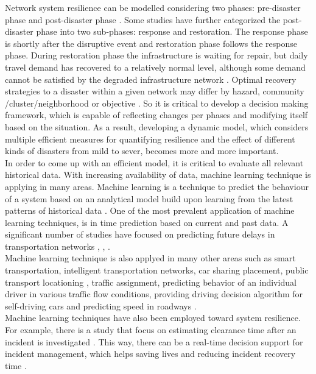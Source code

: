 \documentclass[11pt,twoside]{article}
\numberwithin{equation}{section}
\newcommand{\?}{\stackrel{?}{=}}
\begin{document}
Network system resilience can be modelled considering two phases: pre-disaster phase and post-disaster phase \citep{ahmed2020resilience}. Some studies have further categorized the post-disaster phase into two
  sub-phases: response and restoration. The response phase is shortly after the disruptive event and restoration phase follows the response phase. During restoration phase the infrastructure is waiting for repair, but daily travel demand has recovered to a relatively normal level, although some demand cannot be satisfied by the degraded infrastructure network \citep{tingting2020transportation}. Optimal recovery strategies to a disaster within a given network may differ by hazard, community /cluster/neighborhood or objective \citep{bhatia2015network}. So it is critical to develop a decision making framework, which is capable of reflecting changes per phases and modifying itself based on the situation. As a result, developing a dynamic model, which considers multiple efficient measures for quantifying resilience and the effect of different kinds of disasters from mild to sever, becomes more and more important.\\
In order to come up with an efficient model, it is critical to evaluate all relevant historical data. With increasing availability of data, machine learning technique is applying in many areas.  Machine learning is a technique to predict the behaviour of a system based on an analytical model build upon learning from the latest patterns of historical data \citep{tizghadam2019machine}.
One of the most prevalent application of machine learning techniques, is in time prediction based on current and past data. A significant number of studies have focused on predicting future delays in transportation networks
\citep{chandramouleeswaran2018machine}, \citep{takeichi2017prediction}, \citep{choi2016prediction}.\\
Machine learning technique is also applyed in many other areas such as smart transportation, intelligent transportation networks, car sharing placement, public transport locationing \citep{tizghadam2019machine}, traffic assignment, predicting behavior of an individual driver in various traffic flow conditions, providing driving decision algorithm for self-driving cars and predicting speed in roadways \citep{bhavsar2017chapter}.\\
Machine learning techniques have also been employed toward system resilience. For example, there is a study that focus on estimating clearance time after an incident is investigated \citep{tang2020statistical}. This way, there can be a real-time decision support for incident management, which helps saving lives and reducing incident recovery time \citep{bhavsar2017chapter}.
\end{document}
